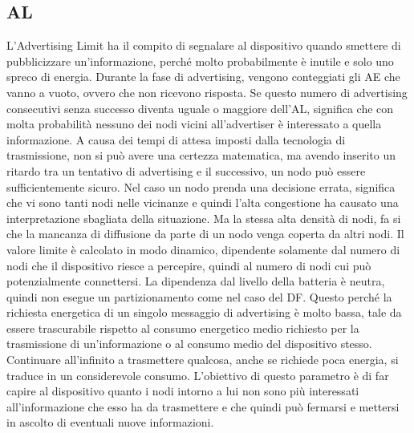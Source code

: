 \subsection{\acf{AL}}
L'Advertising Limit ha il compito di segnalare al dispositivo quando smettere di pubblicizzare un'informazione, perché molto probabilmente è inutile e solo uno spreco di energia.  Durante la fase di advertising, vengono conteggiati gli \acf{AE} che vanno a vuoto, ovvero che non ricevono risposta. Se questo numero di advertising consecutivi senza successo diventa uguale o maggiore dell'\acs{AL}, significa che con molta probabilità nessuno dei nodi vicini all'advertiser è interessato a quella informazione. A causa dei tempi di attesa imposti dalla tecnologia di trasmissione, non si può avere una certezza matematica, ma avendo inserito un ritardo tra un tentativo di advertising e il successivo, un nodo può essere sufficientemente sicuro. Nel caso un nodo prenda una decisione errata, significa che vi sono tanti nodi nelle vicinanze e quindi l'alta congestione ha causato una interpretazione sbagliata della situazione. Ma la stessa alta densità di nodi, fa si che la mancanza di diffusione da parte di un nodo venga coperta da altri nodi. Il valore limite è calcolato in modo dinamico, dipendente solamente dal numero di nodi che il dispositivo riesce a percepire, quindi al numero di nodi cui può potenzialmente connettersi. La dipendenza dal livello della batteria è neutra, quindi non esegue un partizionamento come nel caso del \acs{DF}. Questo perché la richiesta energetica di un singolo messaggio di advertising è molto bassa, tale da essere trascurabile rispetto al consumo energetico medio richiesto per la trasmissione di un'informazione o al consumo medio del dispositivo stesso. Continuare all'infinito a trasmettere qualcosa, anche se richiede poca energia, si traduce in un considerevole consumo. L'obiettivo di questo parametro è di far capire al dispositivo quanto i nodi intorno a lui non sono più interessati all'informazione che esso ha da trasmettere e che quindi può fermarsi e mettersi in ascolto di eventuali nuove informazioni.

